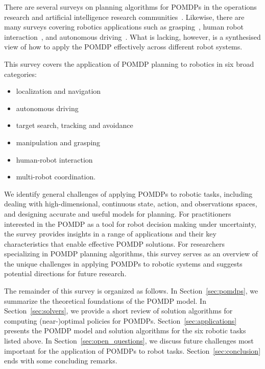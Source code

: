 \documentclass[journal]{IEEEtran}
\begin{document}
%
%
%


{There are several surveys on planning algorithms for POMDPs in the operations research and artificial intelligence research communities}~\cite{hauskrecht2000value,monahan1982state,white1991survey,lovejoy1991survey,shani2013survey}.
Likewise, there are many surveys covering robotics applications such as grasping~\cite{bohg2014grasping}, human robot interaction~\cite{lasota2017safe}, and autonomous driving~\cite{sorin2019deep}.
What is lacking, however, is a synthesised view of how to apply the POMDP effectively across different {robot systems}.

This survey covers the application of POMDP planning to robotics in six broad categories:
\begin{itemize}
    \item localization and navigation
    \item autonomous driving
    \item target search, tracking and avoidance
    \item manipulation and grasping
    \item human-robot interaction
    \item multi-robot coordination.
\end{itemize}
We identify general challenges of applying POMDPs to {robotic} tasks,  including dealing with high-dimensional, continuous state, action, and observations spaces, and designing accurate and useful models for planning.
For practitioners interested in the POMDP as a tool for robot decision making under uncertainty,  the survey provides insights in a range of applications and their key characteristics that enable effective POMDP solutions.
%
For researchers specializing in POMDP planning algorithms, this survey serves as an overview of the unique challenges in applying POMDPs to {robotic systems} and suggests potential directions for future research.

The remainder of this survey is organized as follows.
In Section~\ref{sec:pomdps}, we  summarize the theoretical foundations of the POMDP model.
In Section~\ref{sec:solvers}, we provide a short review of solution algorithms for computing (near-)optimal policies for POMDPs.
Section~\ref{sec:applications} presents the POMDP model and solution algorithms for the six {robotic tasks} listed above.
%
In Section~\ref{sec:open_questions}, we discuss future challenges  most important for the application of POMDPs to robot tasks.
Section~\ref{sec:conclusion} ends with some concluding remarks.
\end{document}
